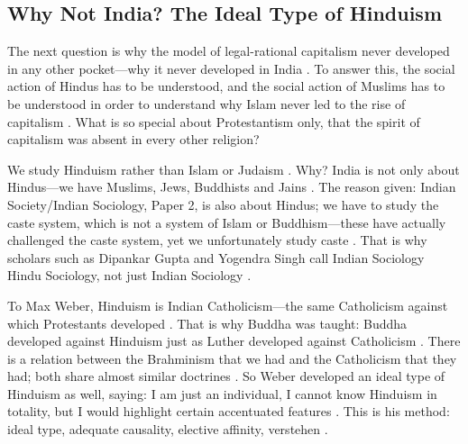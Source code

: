 \subsection{Why Not India? The Ideal Type of Hinduism}
The next question is why the model of legal-rational capitalism never developed in any other pocket---why it never developed in India . To answer this, the social action of Hindus has to be understood, and the social action of Muslims has to be understood in order to understand why Islam never led to the rise of capitalism . What is so special about Protestantism only, that the spirit of capitalism was absent in every other religion? 

\begin{CriticalPoint}
We study Hinduism rather than Islam or Judaism . Why? India is not only about Hindus---we have Muslims, Jews, Buddhists and Jains .
The reason given: Indian Society/Indian Sociology, Paper 2, is also about Hindus; we have to study the caste system, which is not a system of Islam or Buddhism---these have actually challenged the caste system, yet we unfortunately study caste .
That is why scholars such as Dipankar Gupta and Yogendra Singh call Indian Sociology Hindu Sociology, not just Indian Sociology .
\end{CriticalPoint}

\begin{KeyConcept}
To Max Weber, Hinduism is Indian Catholicism---the same Catholicism against which Protestants developed .
That is why Buddha was taught: Buddha developed against Hinduism just as Luther developed against Catholicism . There is a relation between the Brahminism that we had and the Catholicism that they had; both share almost similar doctrines .
So Weber developed an ideal type of Hinduism as well, saying: I am just an individual, I cannot know Hinduism in totality, but I would highlight certain accentuated features . This is his method: ideal type, adequate causality, elective affinity, verstehen .
\end{KeyConcept}

